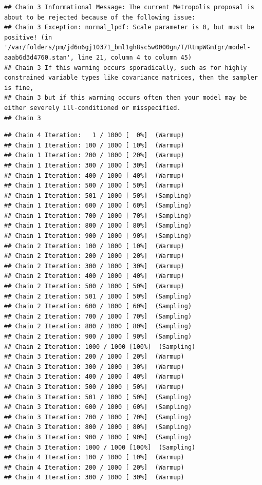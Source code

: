\documentclass[
]{book}
\begin{document}
\begin{verbatim}
## Chain 3 Informational Message: The current Metropolis proposal is about to be rejected because of the following issue:
## Chain 3 Exception: normal_lpdf: Scale parameter is 0, but must be positive! (in '/var/folders/pm/jd6n6gj10371_bml1gh8sc5w0000gn/T/RtmpWGmIgr/model-aaab6d3d4760.stan', line 21, column 4 to column 45)
## Chain 3 If this warning occurs sporadically, such as for highly constrained variable types like covariance matrices, then the sampler is fine,
## Chain 3 but if this warning occurs often then your model may be either severely ill-conditioned or misspecified.
## Chain 3
\end{verbatim}

\begin{verbatim}
## Chain 4 Iteration:   1 / 1000 [  0%]  (Warmup) 
## Chain 1 Iteration: 100 / 1000 [ 10%]  (Warmup) 
## Chain 1 Iteration: 200 / 1000 [ 20%]  (Warmup) 
## Chain 1 Iteration: 300 / 1000 [ 30%]  (Warmup) 
## Chain 1 Iteration: 400 / 1000 [ 40%]  (Warmup) 
## Chain 1 Iteration: 500 / 1000 [ 50%]  (Warmup) 
## Chain 1 Iteration: 501 / 1000 [ 50%]  (Sampling) 
## Chain 1 Iteration: 600 / 1000 [ 60%]  (Sampling) 
## Chain 1 Iteration: 700 / 1000 [ 70%]  (Sampling) 
## Chain 1 Iteration: 800 / 1000 [ 80%]  (Sampling) 
## Chain 1 Iteration: 900 / 1000 [ 90%]  (Sampling) 
## Chain 2 Iteration: 100 / 1000 [ 10%]  (Warmup) 
## Chain 2 Iteration: 200 / 1000 [ 20%]  (Warmup) 
## Chain 2 Iteration: 300 / 1000 [ 30%]  (Warmup) 
## Chain 2 Iteration: 400 / 1000 [ 40%]  (Warmup) 
## Chain 2 Iteration: 500 / 1000 [ 50%]  (Warmup) 
## Chain 2 Iteration: 501 / 1000 [ 50%]  (Sampling) 
## Chain 2 Iteration: 600 / 1000 [ 60%]  (Sampling) 
## Chain 2 Iteration: 700 / 1000 [ 70%]  (Sampling) 
## Chain 2 Iteration: 800 / 1000 [ 80%]  (Sampling) 
## Chain 2 Iteration: 900 / 1000 [ 90%]  (Sampling) 
## Chain 2 Iteration: 1000 / 1000 [100%]  (Sampling) 
## Chain 3 Iteration: 200 / 1000 [ 20%]  (Warmup) 
## Chain 3 Iteration: 300 / 1000 [ 30%]  (Warmup) 
## Chain 3 Iteration: 400 / 1000 [ 40%]  (Warmup) 
## Chain 3 Iteration: 500 / 1000 [ 50%]  (Warmup) 
## Chain 3 Iteration: 501 / 1000 [ 50%]  (Sampling) 
## Chain 3 Iteration: 600 / 1000 [ 60%]  (Sampling) 
## Chain 3 Iteration: 700 / 1000 [ 70%]  (Sampling) 
## Chain 3 Iteration: 800 / 1000 [ 80%]  (Sampling) 
## Chain 3 Iteration: 900 / 1000 [ 90%]  (Sampling) 
## Chain 3 Iteration: 1000 / 1000 [100%]  (Sampling) 
## Chain 4 Iteration: 100 / 1000 [ 10%]  (Warmup) 
## Chain 4 Iteration: 200 / 1000 [ 20%]  (Warmup) 
## Chain 4 Iteration: 300 / 1000 [ 30%]  (Warmup) 

\end{verbatim}
\end{document}
